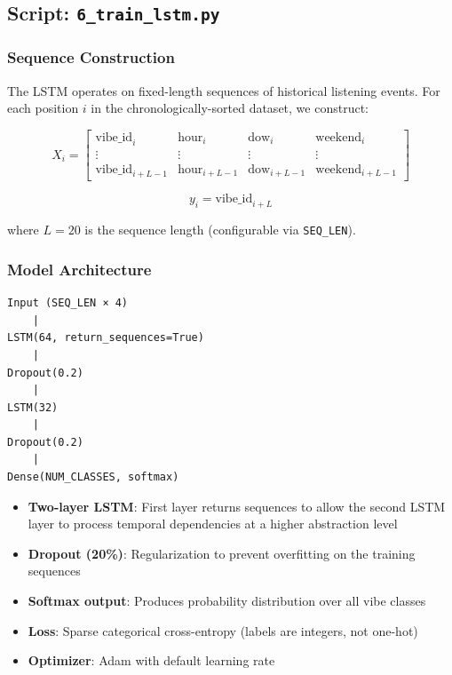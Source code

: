 \documentclass[12pt, a4paper]{article}
\begin{document}
\subsection{Script: \texttt{6\_train\_lstm.py}}

\subsubsection{Sequence Construction}
The LSTM operates on fixed-length sequences of historical listening events. For each position $i$ in the chronologically-sorted dataset, we construct:

$$X_i = \begin{bmatrix} \text{vibe\_id}_{i} & \text{hour}_{i} & \text{dow}_{i} & \text{weekend}_{i} \\ \vdots & \vdots & \vdots & \vdots \\ \text{vibe\_id}_{i+L-1} & \text{hour}_{i+L-1} & \text{dow}_{i+L-1} & \text{weekend}_{i+L-1} \end{bmatrix}$$

$$y_i = \text{vibe\_id}_{i+L}$$

where $L = 20$ is the sequence length (configurable via \texttt{SEQ\_LEN}).

\subsubsection{Model Architecture}

\begin{verbatim}
Input (SEQ_LEN × 4)
    |
LSTM(64, return_sequences=True)
    |
Dropout(0.2)
    |
LSTM(32)
    |
Dropout(0.2)
    |
Dense(NUM_CLASSES, softmax)
\end{verbatim}

\begin{itemize}
    \item \textbf{Two-layer LSTM}: First layer returns sequences to allow the second LSTM layer to process temporal dependencies at a higher abstraction level
    \item \textbf{Dropout (20\%)}: Regularization to prevent overfitting on the training sequences
    \item \textbf{Softmax output}: Produces probability distribution over all vibe classes
    \item \textbf{Loss}: Sparse categorical cross-entropy (labels are integers, not one-hot)
    \item \textbf{Optimizer}: Adam with default learning rate
\end{itemize}
\end{document}
